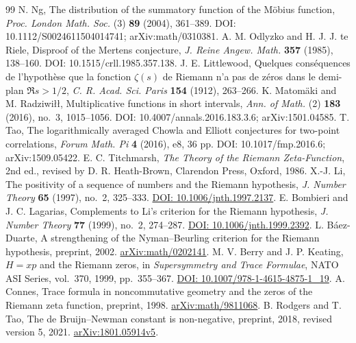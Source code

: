\documentclass[11pt]{amsart}
\numberwithin{equation}{section}
\theoremstyle{plain}
\theoremstyle{definition}
\theoremstyle{remark}
\begin{document}
\begin{thebibliography}{99}
N. Ng,
The distribution of the summatory function of the M\"obius function,
\emph{Proc. London Math. Soc.} (3) \textbf{89} (2004), 361--389.
DOI: 10.1112/S0024611504014741; arXiv:math/0310381.
A. M. Odlyzko and H. J. J. te Riele,
Disproof of the Mertens conjecture,
\emph{J. Reine Angew. Math.} \textbf{357} (1985), 138--160.
DOI: 10.1515/crll.1985.357.138.
J. E. Littlewood,
Quelques cons\'equences de l'hypoth\`ese que la fonction $\zeta(s)$ de Riemann
n'a pas de z\'eros dans le demi-plan $\Re s>1/2$,
\emph{C. R. Acad. Sci. Paris} \textbf{154} (1912), 263--266.
K. Matom\"aki and M. Radziwi\l\l,
Multiplicative functions in short intervals,
\emph{Ann. of Math.} (2) \textbf{183} (2016), no.~3, 1015--1056.
DOI: 10.4007/annals.2016.183.3.6; arXiv:1501.04585.
T. Tao,
The logarithmically averaged Chowla and Elliott conjectures for two-point correlations,
\emph{Forum Math. Pi} \textbf{4} (2016), e8, 36 pp.
DOI: 10.1017/fmp.2016.6; arXiv:1509.05422.
E. C. Titchmarsh,
\emph{The Theory of the Riemann Zeta-Function},
2nd ed., revised by D. R. Heath-Brown, Clarendon Press, Oxford, 1986.
X.-J. Li,
The positivity of a sequence of numbers and the Riemann hypothesis,
\emph{J. Number Theory} \textbf{65} (1997), no.~2, 325--333.
\href{https://doi.org/10.1006/jnth.1997.2137}{DOI: 10.1006/jnth.1997.2137}.
E. Bombieri and J. C. Lagarias,
Complements to Li's criterion for the Riemann hypothesis,
\emph{J. Number Theory} \textbf{77} (1999), no.~2, 274--287.
\href{https://doi.org/10.1006/jnth.1999.2392}{DOI: 10.1006/jnth.1999.2392}.
L. B\'aez-Duarte,
A strengthening of the Nyman--Beurling criterion for the Riemann hypothesis,
preprint, 2002.
\href{https://arxiv.org/abs/math/0202141}{arXiv:math/0202141}.
M. V. Berry and J. P. Keating,
$H=xp$ and the Riemann zeros,
in \emph{Supersymmetry and Trace Formulae}, NATO ASI Series, vol.~370,
1999, pp.~355--367.
\href{https://doi.org/10.1007/978-1-4615-4875-1_19}{DOI: 10.1007/978-1-4615-4875-1\_19}.
A. Connes,
Trace formula in noncommutative geometry and the zeros of the Riemann zeta
function, preprint, 1998.
\href{https://arxiv.org/abs/math/9811068}{arXiv:math/9811068}.
B. Rodgers and T. Tao,
The de Bruijn--Newman constant is non-negative,
preprint, 2018, revised version 5, 2021.
\href{https://arxiv.org/abs/1801.05914v5}{arXiv:1801.05914v5}.

\end{thebibliography}
\end{document}
